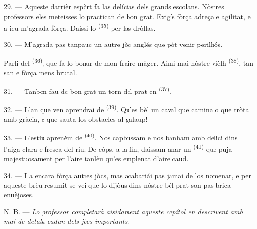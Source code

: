29. --- Aqueste darrièr espòrt fa las delícias dels grands escolans. Nòstres
professors eles meteisses lo practican de bon grat. Exigís fòrça adreça e
agilitat, e a ieu m'agrada fòrça. Daissi lo 
\textsuperscript{(35)} per las dròllas.

30. --- M'agrada pas tanpauc un autre jòc anglés que pòt venir perilhós.

Parli del  \textsuperscript{(36)}, que fa lo bonur de mon fraire
màger. Aimi mai nòstre vièlh  \textsuperscript{(38)}, tan
san e fòrça mens brutal.

\VUsaut{4.6mm}
\VUsaut{3.0mm}

31. --- Tanben fau de bon grat un torn del prat en 
\textsuperscript{(37)}.

32. --- L'an que ven aprendrai de 
\textsuperscript{(39)}. Qu'es bèl un caval que camina o que tròta amb gràcia, e
que sauta los obstacles al galaup!

33. --- L'estiu aprenèm de  \textsuperscript{(40)}. Nos capbussam e
nos banham amb delici dins l'aiga clara e fresca del riu. De còps, a la fin,
daissam anar un  \textsuperscript{(41)} que puja
majestuosament per l'aire tanlèu qu'es emplenat d'aire caud.

34. --- I a encara fòrça autres jòcs, mas acabariái pas jamai de los nomenar, e
per aqueste brèu resumit se vei que lo dijòus dins nòstre bèl prat son pas
brica enuèjoses.

N. B. --- \textit{Lo professor completarà aisidament aqueste capítol en descrivent
amb mai de detalh cadun dels jòcs importants.}
\VUsaut{6.0mm}
\VUfilet{22mm}

